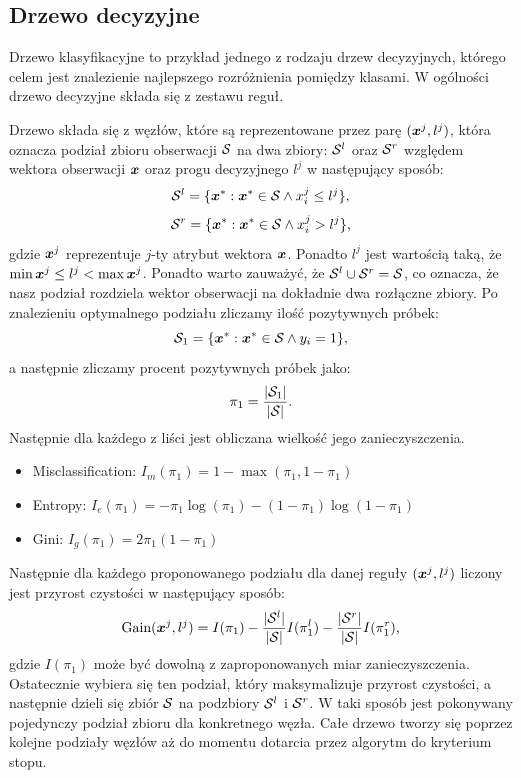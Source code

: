 \documentclass[openany]{book}
\begin{document}
\subsection{Drzewo decyzyjne}
\label{drzewo}

	Drzewo klasyfikacyjne to przykład jednego z rodzaju drzew decyzyjnych, którego celem jest znalezienie najlepszego rozróżnienia pomiędzy klasami. W ogólności drzewo decyzyjne składa się z zestawu reguł.
	
	Drzewo składa się z węzłów, które są reprezentowane przez parę $(\boldsymbol{x}^j, l^j)$, która oznacza podział zbioru obserwacji $\mathcal{S}$ na dwa zbiory: $\mathcal{S}^{l}$ oraz $\mathcal{S}^{r}$ względem wektora obserwacji $\boldsymbol{x}$ oraz progu decyzyjnego $l^j$ w następujący sposób:
	$$ \mathcal{S}^l = \{ \boldsymbol{x}^* : \boldsymbol{x}^* \in \mathcal{S} \land x^j_i \leq l^j \} \text{,} $$
	$$ \mathcal{S}^r = \{ \boldsymbol{x}^* : \boldsymbol{x}^* \in \mathcal{S} \land x^j_i > l^j \} \text{,} $$
	gdzie $\boldsymbol{x}^j$ reprezentuje $j$-ty atrybut wektora $\boldsymbol{x}$. Ponadto $l^j$ jest wartością taką, że $\min{\boldsymbol{x}^j} \leq l^j < \max{\boldsymbol{x}^j}$. Ponadto warto zauważyć, że $\mathcal{S}^l \cup \mathcal{S}^r = \mathcal{S}$, co oznacza, że nasz podział rozdziela wektor obserwacji na dokładnie dwa rozłączne zbiory.
	Po znalezieniu optymalnego podziału zliczamy ilość pozytywnych próbek:
	$$ \mathcal{S}_1  = \{ \boldsymbol{x}^* : \boldsymbol{x}^* \in \mathcal{S} \land y_i = 1 \} \text{,} $$
	a następnie zliczamy procent pozytywnych próbek jako:
	$$ \pi_1 = \frac{|\mathcal{S}_1|}{|\mathcal{S}|} \text{.}$$
	Następnie dla każdego z liści jest obliczana wielkość jego zanieczyszczenia.
	\begin{itemize}
		\item Misclassification: $I_m(\pi_1) = 1 - \max(\pi_1, 1 - \pi_1)$
		\item Entropy: $I_e(\pi_1) = -\pi_1 \log(\pi_1) - (1 - \pi_1) \log (1 - \pi_1)$
		\item Gini: $I_g(\pi_1) = 2 \pi_1 (1 - \pi_1)$
	\end{itemize}{}
	Następnie dla każdego proponowanego podziału dla danej reguły $(\boldsymbol{x}^j, l^j)$ liczony jest przyrost czystości w następujący sposób:
	$$ \text{Gain}(\boldsymbol{x}^j, l^j) = I(\pi_1) - \frac{|\mathcal{S}^l|}{|\mathcal{S}|} I(\pi_1^l) - \frac{|\mathcal{S}^r|}{|\mathcal{S}|} I(\pi_1^r) \text{,}$$
	gdzie $I(\pi_1)$ może być dowolną z zaproponowanych miar zanieczyszczenia.
	Ostatecznie wybiera się ten podział, który maksymalizuje przyrost czystości, a następnie dzieli się zbiór $\mathcal{S}$ na podzbiory $\mathcal{S}^l$ i $\mathcal{S}^r$.
	W taki sposób jest pokonywany pojedynczy podział zbioru dla konkretnego węzła. Całe drzewo tworzy się poprzez kolejne podziały węzłów aż do momentu dotarcia przez algorytm do kryterium stopu.
\end{document}
